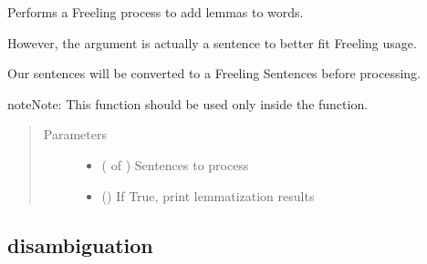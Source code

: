 \documentclass[letterpaper,10pt,english]{sphinxmanual}
\begin{document}
\begin{fulllineitems}
\label{\detokenize{process:loacore.process.lemma_process.add_lemmas_to_sentences}}
Performs a Freeling process to add lemmas to words.

However, the argument is actually a sentence to better fit Freeling usage.

Our sentences will be converted to a Freeling Sentences before processing.

\begin{sphinxadmonition}{note}{Note:}
This function should be used only inside the  function.
\end{sphinxadmonition}
\begin{quote}\begin{description}
\item[{Parameters}] \leavevmode\begin{itemize}
\item {} 
 ( of {\hyperref[\detokenize{classes:loacore.classes.classes.Sentence}]{}}) \textendash{} Sentences to process

\item {} 
 () \textendash{} If True, print lemmatization results

\end{itemize}

\end{description}\end{quote}

\end{fulllineitems}



\subsection{disambiguation}
\label{\detokenize{process:module-loacore.process.synset_process}}\label{\detokenize{process:disambiguation}}
\end{document}
